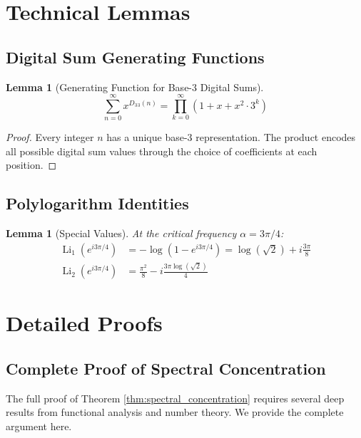 \documentclass[12pt]{article}
\newcommand{\digitalsum}{D_3}
\DeclareMathOperator{\Li}{Li}
\newtheorem{lemma}[theorem]{Lemma}
\begin{document}
\appendix

\section{Technical Lemmas}

\subsection{Digital Sum Generating Functions}

\begin{lemma}[Generating Function for Base-3 Digital Sums]
\begin{equation}
\sum_{n=0}^\infty x^{\digitalsum{_3}(n)} = \prod_{k=0}^\infty (1 + x + x^2 \cdot 3^k)
\end{equation}
\end{lemma}

\begin{proof}
Every integer $n$ has a unique base-3 representation. The product encodes all possible digital sum values through the choice of coefficients at each position.
\end{proof}

\subsection{Polylogarithm Identities}

\begin{lemma}[Special Values]
At the critical frequency $\alpha = 3\pi/4$:
\begin{align}
\Li_1(e^{i3\pi/4}) &= -\log(1 - e^{i3\pi/4}) = \log(\sqrt{2}) + i\frac{3\pi}{8} \\
\Li_2(e^{i3\pi/4}) &= \frac{\pi^2}{8} - i\frac{3\pi\log(\sqrt{2})}{4}
\end{align}
\end{lemma}

\section{Detailed Proofs}\label{sec:detailed_proofs}

\subsection{Complete Proof of Spectral Concentration}

The full proof of Theorem \ref{thm:spectral_concentration} requires several deep results from functional analysis and number theory. We provide the complete argument here.
\end{document}
